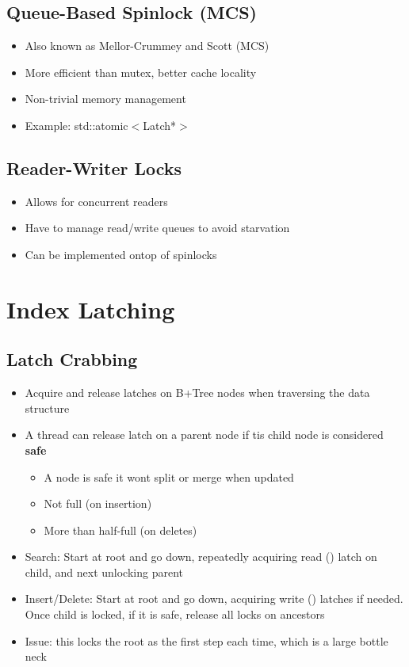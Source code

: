 \documentclass[11pt]{article}
\begin{document}
\subsection*{\textbf{Queue-Based Spinlock (MCS)}}
    \begin{itemize}
        \item Also known as Mellor-Crummey and Scott (MCS)
        \item More efficient than mutex, better cache locality
        \item Non-trivial memory management
        \item Example: std::atomic$<$Latch*$>$
    \end{itemize}
\subsection*{\textbf{Reader-Writer Locks}}
    \begin{itemize}
        \item Allows for concurrent readers
        \item Have to manage read/write queues to avoid starvation
        \item Can be implemented ontop of spinlocks
    \end{itemize}

\section{Index Latching}
\subsection*{Latch Crabbing}
    \begin{itemize}
        \item Acquire and release latches on B+Tree nodes when traversing the data structure
        \item A thread can release latch on a parent node if tis child node is considered \textbf{safe}
        \begin{itemize}
            \item A node is safe it wont split or merge when updated
            \item Not full (on insertion)
            \item More than half-full (on deletes)
        \end{itemize}
        \item Search: Start at root and go down, repeatedly acquiring read () latch on child, and next unlocking parent
        \item Insert/Delete: Start at root and go down, acquiring write () latches if needed. Once child is locked, if it is safe, release all locks on ancestors
        \item Issue: this locks the root as the first step each time, which is a large bottle neck
    \end{itemize}
\end{document}
